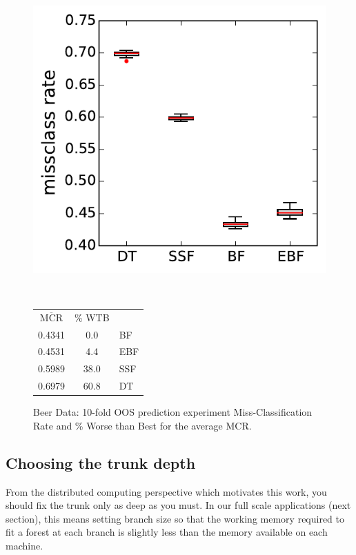 \documentclass{article}
\begin{document}
\begin{figure}
\begin{minipage}{0.5\linewidth}
\includegraphics[width=\textwidth]{../graphs/beer}
\end{minipage}
~~
\begin{minipage}{0.4\linewidth}
{\footnotesize
\begin{tabular}{c c | l}
$\overline{\text{MCR}}$  & \% WTB & \\
\cline{1-2}\rule{0pt}{3ex} 
0.4341 &  0.0 & BF \\
0.4531 &  4.4 & EBF \\
0.5989 & 38.0 & SSF \\
0.6979 & 60.8 & DT \\
\end{tabular}}
\end{minipage}
\caption{\label{beer} Beer Data: 10-fold OOS prediction experiment Miss-Classification Rate and \% Worse than Best for the average MCR. }
\end{figure}

\subsection{Choosing the trunk depth}

From the distributed computing perspective which motivates this work, you should fix the trunk only as deep as you must.  In our full scale applications (next section), this means setting branch size so that the working memory required to fit a forest at each branch is slightly less than the memory available on each machine.
\end{document}

